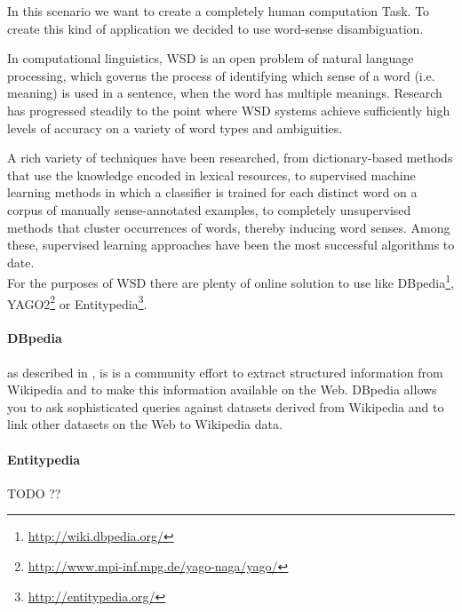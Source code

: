 
% 
In this scenario we want to create a completely human computation Task. To 
create this kind of application we decided to use word-sense disambiguation.

In computational linguistics, \ac{WSD} is an open problem of natural language
processing, which governs the process of identifying which sense of a word
(i.e. meaning) is used in a sentence, when the word has multiple meanings.
Research has progressed steadily to the point where \ac{WSD} systems achieve
sufficiently high levels of accuracy on a variety of word types and ambiguities.

A rich variety of techniques have been researched, from dictionary-based methods
that use the knowledge encoded in lexical resources, to supervised machine
learning methods in which a classifier is trained for each distinct word on a
corpus of manually sense-annotated examples, to completely unsupervised methods
that cluster occurrences of words, thereby inducing word senses. Among these,
supervised learning approaches have been the most successful algorithms to date.\\

For the purposes of \ac{WSD} there are plenty of online solution to use like
DBpedia\footnote{\url{http://wiki.dbpedia.org/}},
YAGO2\footnote{\url{http://www.mpi-inf.mpg.de/yago-naga/yago/}} or
Entitypedia\footnote{\url{http://entitypedia.org/}}.


\paragraph{DBpedia} as described in \cite{auer2007dbpedia}, is is a community
effort to extract structured information from Wikipedia and to make this
information available on the Web. DBpedia allows you to ask sophisticated queries
against datasets derived from Wikipedia and to link other datasets on the Web to
Wikipedia data.

\paragraph{Entitypedia} TODO ??

